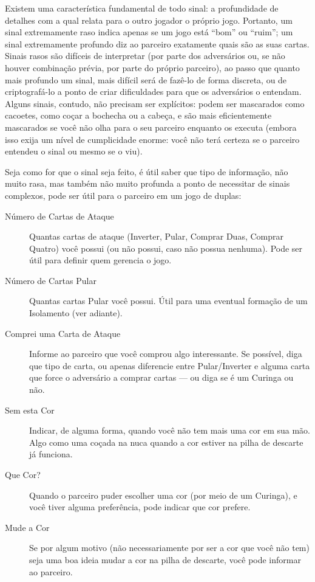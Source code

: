 Existem uma característica fundamental de todo sinal: a profundidade de detalhes com a qual relata para o outro jogador o próprio jogo. Portanto, um sinal extremamente raso indica apenas se um jogo está ``bom'' ou ``ruim''; um sinal extremamente profundo diz ao parceiro exatamente quais são as suas cartas. Sinais rasos são difíceis de interpretar (por parte dos adversários ou, se não houver combinação prévia, por parte do próprio parceiro), ao passo que quanto mais profundo um sinal, mais difícil será de fazê-lo de forma discreta, ou de criptografá-lo a ponto de criar dificuldades para que os adversários o entendam. Alguns sinais, contudo, não precisam ser explícitos: podem ser mascarados como cacoetes, como coçar a bochecha ou a cabeça, e são mais eficientemente mascarados se você não olha para o seu parceiro enquanto os executa (embora isso exija um nível de cumplicidade enorme: você não terá certeza se o parceiro entendeu o sinal ou mesmo se o viu).

Seja como for que o sinal seja feito, é útil saber que tipo de informação, não muito rasa, mas também não muito profunda a ponto de necessitar de sinais complexos, pode ser útil para o parceiro em um jogo de duplas:

\begin{description}
\item[Número de Cartas de Ataque]{Quantas cartas de ataque (Inverter, Pular, Comprar Duas, Comprar Quatro) você possui (ou não possui, caso não possua nenhuma). Pode ser útil para definir quem gerencia o jogo.}
\item[Número de Cartas Pular]{Quantas cartas Pular você possui. Útil para uma eventual formação de um Isolamento (ver adiante).}
\item[Comprei uma Carta de Ataque]{Informe ao parceiro que você comprou algo interessante. Se possível, diga que tipo de carta, ou apenas diferencie entre Pular/Inverter e alguma carta que force o adversário a comprar cartas --- ou diga se é um Curinga ou não.}
\item[Sem esta Cor]{Indicar, de alguma forma, quando você não tem mais uma cor em sua mão. Algo como uma coçada na nuca quando a cor estiver na pilha de descarte já funciona.}
\item[Que Cor?]{Quando o parceiro puder escolher uma cor (por meio de um Curinga), e você tiver alguma preferência, pode indicar que cor prefere.}
\item[Mude a Cor]{Se por algum motivo (não necessariamente por ser a cor que você não tem) seja uma boa ideia mudar a cor na pilha de descarte, você pode informar ao parceiro.}
\end{description}


